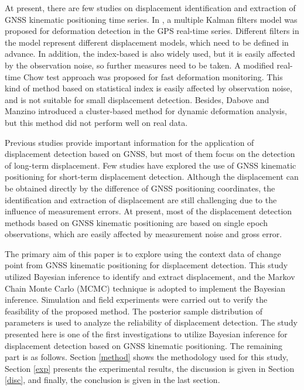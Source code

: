\documentclass[final,3p,times]{elsarticle}
\begin{document}
	At present, there are few studies on displacement identification and extraction of GNSS kinematic positioning time series. In \cite{li2010deformation}, a multiple Kalman filters model was proposed for deformation detection in the GPS real-time series. Different filters in the model represent different displacement models, which need to be defined in advance. 
	In addition, the index-based is also widely used, but it is easily affected by the observation noise, so further measures need to be taken\cite{shen_shortterm2021}.
	A modified real-time Chow test approach was proposed for fast deformation monitoring\cite{bellone2016real}. This kind of method based on statistical index is easily affected by observation noise, and is not suitable for small displacement detection\cite{pirotti2015micro}. Besides, Dabove and Manzino\cite{dabove2016fast} introduced a cluster-based method for dynamic deformation analysis, but this method did not perform well on real data.
	
	Previous studies provide important information for the application of displacement detection based on GNSS, but most of them focus on the detection of long-term displacement. 
	Few studies have explored the use of GNSS kinematic positioning for short-term displacement detection. 
	Although the displacement can be obtained directly by the difference of GNSS positioning coordinates, the identification and extraction of displacement are still challenging due to the influence of measurement errors.
	At present, most of the displacement detection methods based on GNSS kinematic positioning are based on single epoch observations, which are easily affected by measurement noise and gross error.
	
	The primary aim of this paper is to explore using the context data of change point from GNSS kinematic positioning for displacement detection. 
	This study utilized Bayesian inference to identify and extract displacement, and the Markov Chain Monte Carlo (MCMC) technique is adopted to implement the Bayesian inference. 
	Simulation and field experiments were carried out to verify the feasibility of the proposed method. 
	The posterior sample distribution of parameters is used to analyze the reliability of displacement detection. 
	The study presented here is one of the first investigations to utilize Bayesian inference for displacement detection based on GNSS kinematic positioning. 
	The remaining part is as follows. Section \ref{method} shows the methodology used for this study, Section \ref{exp} presents the experimental results, the discussion is given in Section \ref{disc}, and finally, the conclusion is given in the last section.
	
\end{document}
